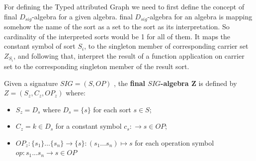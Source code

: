 For defining the Typed attributed Graph we need to first define the concept of final $D_{sig}$-algebra for a given algebra. final $D_{sig}$-algebra for an algebra is mapping somehow the name of the sort as a set to the sort as its interpretation. So cardinality of the interpreted sorts would be 1 for all of them. It maps the constant symbol of sort $S_i$, to the singleton member of corresponding carrier set $Z_{S_i}$, and following that, interpret the result of a function application on carrier set to the corresponding singleton member of the result sort.  
\begin{ProposalDef}
Given a signature $SIG = (S, OP)$ , the \textbf{final $SIG$-algebra Z} is defined by $Z=(S_z, C_z, OP_z)$ where:

\begin{itemize}
	\item $S_z = D_s$ where  $D_s=\{s\}$ for each sort $s \in S$;
	\item $C_z = k \in D_s$  for a constant symbol $c_s: \rightarrow s \in OP$;
	\item $OP_z : \{s_1\} \ldots  \{s_n\} \rightarrow \{s\} : (s_1 ... s_n) \mapsto s$ for each operation symbol
$op:s_1 ... s_n \rightarrow s \in OP$
 \end{itemize}

\end{ProposalDef}


%
%

